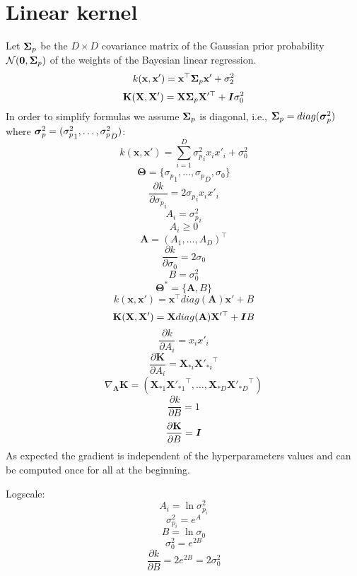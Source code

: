 \documentclass[a4paper,11pt]{article}
\newcommand\x{{\mathbf x}}
\newcommand\X{{\mathbf X}}
\newcommand\K{{\mathbf K}}
\newcommand{\Ivec}[1]{\mbox{\boldmath $#1$}}
\begin{document}
\section{Linear kernel}
Let $\Ivec{\Sigma}_p$ be the $D \times D$ covariance matrix of the Gaussian
prior probability $\mathcal{N}(\Ivec{0},\Ivec{\Sigma}_p)$ of the weights of
the Bayesian linear regression.
$$k(\x,\x') = \x^{\top} \Ivec{\Sigma}_p \x' + \sigma_2^2$$
$$\K(\X,\X') = \X \Ivec{\Sigma}_p \X'^{\top} + \Ivec{I}\sigma_0^2$$
In order to simplify formulas we assume $\Ivec{\Sigma}_p$ is diagonal, i.e.,
$\Ivec{\Sigma}_p = diag(\Ivec{\sigma}^2_p)$ where $\Ivec{\sigma}^2_p =
({\sigma^2_p}_1,\ldots,{\sigma^2_p}_D)$:
$$k(\x,\x') = \sum_{i=1}^D {\sigma^2_p}_i x_i x'_i + \sigma_0^2$$
$$\mathbf{\Theta} = \{{\sigma_p}_1,\ldots,{\sigma_p}_D,\sigma_0\}$$
$$\frac{\partial k}{\partial {\sigma_p}_i} = 2 {\sigma_p}_i x_i x'_i$$
$$A_i = {\sigma_p^2}_i$$
$$A_i \ge 0$$
$$\mathbf{A} = (A_1,\ldots,A_D)^{\top}$$
$$\frac{\partial k}{\partial \sigma_0} = 2 \sigma_0$$
$$B = \sigma_0^2$$
$$\mathbf{\Theta}^* = \{ \mathbf{A} , B\}$$
$$k(\x,\x') = \x^{\top} diag(\mathbf{A}) \x' + B$$
$$\K(\X,\X') = \X diag(\mathbf{A}) \X'^{\top} + \Ivec{I}B$$
$$\frac{\partial k}{\partial A_i} = x_i x'_i$$
$$\frac{\partial \K}{\partial A_i} = \X_{* i} {\X'_{* i}}^{\top}$$
$$\nabla_{\mathbf{A}} \K = ( \X_{* 1} {\X'_{* 1}}^{\top}, \ldots,
\X_{* D} {\X'_{* D}}^{\top})$$
$$\frac{\partial k}{\partial B} = 1$$
$$\frac{\partial \K}{\partial B} = \Ivec{I}$$
As expected the gradient is independent of the hyperparameters values
and can be computed once for all at the beginning.

Logscale:
$$A_i = \ln{\sigma_{p_i}^2}$$
$$\sigma_{p_i}^2 = e^{A}$$
$$B = \ln{\sigma_0}$$
$$\sigma_0^2 = e^{2B}$$
$$\frac{\partial k}{\partial B} = 2 e^{2B} = 2 \sigma_0^2$$
\end{document}

